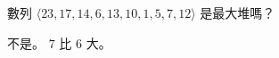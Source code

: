 \startEXERCISE
數列 $\langle 23, 17, 14, 6, 13, 10, 1, 5, 7, 12 \rangle$ 是最大堆嗎？
\stopEXERCISE

\startANSWER
不是。 $7$ 比 $6$ 大。

\externalfigure[e6_1_6-1]

\stopANSWER

